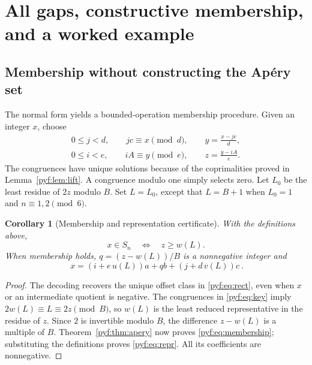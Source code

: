 \documentclass[11pt,a4paper]{article}
\numberwithin{equation}{section}
\newtheorem{corollary}[theorem]{Corollary}
\theoremstyle{definition}
\begin{document}
\section{All gaps, constructive membership, and a worked example}\label{pyf:sec:membership}

\subsection{Membership without constructing the Ap\'ery set}

The normal form yields a bounded-operation membership procedure. Given an
integer $x$, choose
\begin{equation}\label{pyf:eq:decode}
\begin{gathered}
0\leq j<d,\qquad jc\equiv x\pmod d,\qquad
 y=\frac{x-jc}{d},\\
0\leq i<e,\qquad iA\equiv y\pmod e,\qquad
 z=\frac{y-iA}{e}.
\end{gathered}
\end{equation}
The congruences have unique solutions because of the coprimalities proved
in Lemma~\ref{pyf:lem:lift}. A congruence modulo one simply selects zero.
Let $L_0$ be the least residue of $2z$ modulo $B$. Set $L=L_0$, except that
$L=B+1$ when $L_0=1$ and $n\equiv1,2\pmod6$.

\begin{corollary}[Membership and representation certificate]\label{pyf:cor:membership}
With the definitions above,
\begin{equation}\label{pyf:eq:membership}
x\in S_n\quad\Longleftrightarrow\quad z\geq w(L).
\end{equation}
When membership holds, $q=(z-w(L))/B$ is a nonnegative integer and
\begin{equation}\label{pyf:eq:repr}
\boxed{\ x=(i+e\,u(L))a+q b+(j+d\,v(L))c\ }.
\end{equation}
\end{corollary}

\begin{proof}
The decoding recovers the unique offset class in \eqref{pyf:eq:rect}, even when
$x$ or an intermediate quotient is negative. The congruences in
\eqref{pyf:eq:key} imply $2w(L)\equiv L\equiv2z\pmod B$, so $w(L)$ is the
least reduced representative in the residue of $z$. Since $2$ is invertible
modulo $B$, the difference $z-w(L)$ is a multiple of $B$. Theorem~\ref{pyf:thm:apery}
now proves \eqref{pyf:eq:membership}; substituting the definitions proves
\eqref{pyf:eq:repr}. All its coefficients are nonnegative.
\end{proof}
\end{document}

